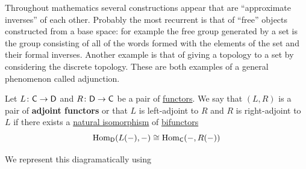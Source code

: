 \documentclass[../../main]{subfiles}
\begin{document}
Throughout mathematics several constructions appear that are ``approximate inverses'' of each other.
Probably the most recurrent is that of ``free'' objects constructed from a base space: for example the free group generated by a set is the group consisting of all of the words formed with the elements of the set and their formal inverses.
Another example is that of giving a topology to a set by considering the discrete topology.
These are both examples of a general phenomenon called adjunction.
\begin{definition}\label{def:adjoint-functors}
  Let \(L\colon \mathsf{C} \to \mathsf{D}\) and \(R\colon \mathsf{D} \to \mathsf{C}\) be a pair of \hyperref[def:functor]{functors}.
  We say that \((L, R)\) is a pair of \textbf{adjoint functors} or that \(L\) is left-adjoint to \(R\) and \(R\) is right-adjoint to \(L\) if there exists a \hyperref[def:natural-transformation]{natural isomorphism} of \hyperref[ex:bifunctor]{bifunctors}
  \begin{equation}\label{eq:adjunction-hom-iso}
    \operatorname{Hom}_{\mathsf{D}}(L(-), -) \cong \operatorname{Hom}_{\mathsf{C}}(-, R(-))
  \end{equation}

  We represent this diagramatically using
  \begin{center}
  \end{center}
\end{definition}
\end{document}
